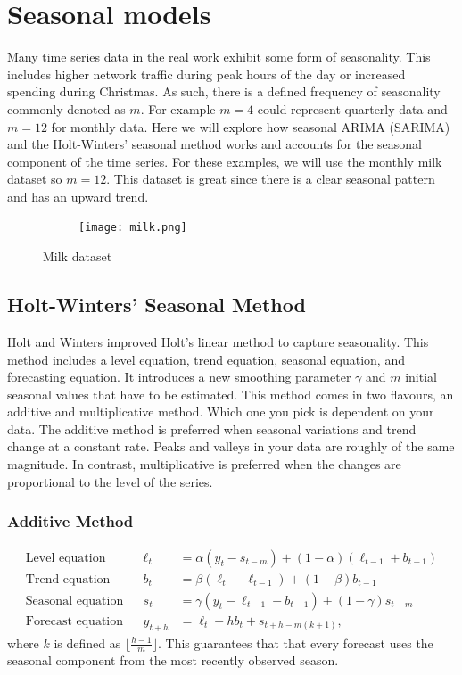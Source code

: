 \documentclass{article}
\begin{document}
  \newpage

  \section{Seasonal models}
  Many time series data in the real work exhibit some form of seasonality. This includes higher network traffic during peak hours of the day or increased spending during Christmas. As such, there is a defined frequency of seasonality commonly denoted as $m$. For example $m=4$ could represent quarterly data and $m=12$ for monthly data. Here we will explore how seasonal ARIMA (SARIMA) and the Holt-Winters' seasonal method works and accounts for the seasonal component of the time series. For these examples, we will use the monthly milk dataset so $m=12$. This dataset is great since there is a clear seasonal pattern and has an upward trend.
  \begin{figure}[H]
    \centering
    \captionsetup{justification=centering}
    \begin{subfigure}[b]{\linewidth}
      \texttt{[image: milk.png]}
    \end{subfigure}
    \caption{Milk dataset}
  \end{figure}

  \newpage
  \subsection{Holt-Winters' Seasonal Method}
  Holt and Winters improved Holt's linear method to capture seasonality. This method includes a level equation, trend equation, seasonal equation, and forecasting equation. It introduces a new smoothing parameter $\gamma$ and $m$ initial seasonal values that have to be estimated. This method comes in two flavours, an additive and multiplicative method. Which one you pick is dependent on your data. The additive method is preferred when seasonal variations and trend change at a constant rate. Peaks and valleys in your data are roughly of the same magnitude. In contrast, multiplicative is preferred when the changes are proportional to the level of the series. 

  \subsubsection{Additive Method}
  \begin{align*}
    \text{Level equation}   &&\ell_{t} &= \alpha(y_{t} - s_{t-m}) + (1 - \alpha)(\ell_{t-1} + b_{t-1})\\
    \text{Trend equation}   &&b_{t} &= \beta(\ell_{t} - \ell_{t-1}) + (1 - \beta)b_{t-1}\\
    \text{Seasonal equation}   &&s_{t} &= \gamma (y_{t}-\ell_{t-1}-b_{t-1}) + (1-\gamma)s_{t-m}\\
    \text{Forecast equation}   && \hat{y}_{t+h} &= \ell_{t} + hb_{t} + s_{t+h-m(k+1)},
  \end{align*}
  where $k$ is defined as $\lfloor\frac{h-1}{m}\rfloor$. This guarantees that that every forecast uses the seasonal component from the most recently observed season. 
\end{document}
